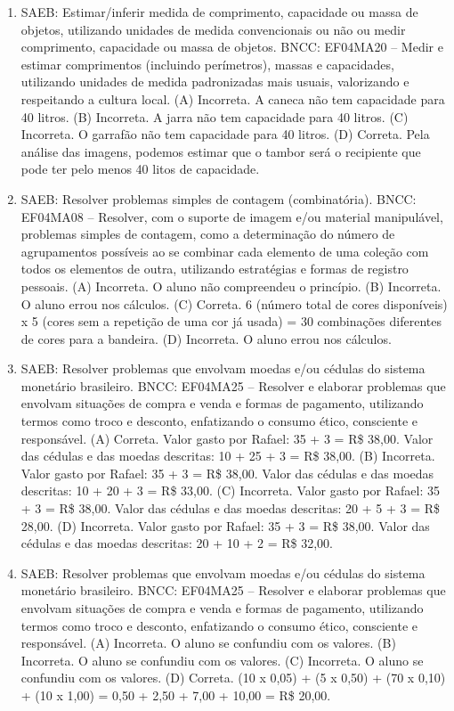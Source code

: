 \begin{enumerate}
\item
SAEB: Estimar/inferir medida de comprimento, capacidade ou
massa de objetos, utilizando unidades de medida convencionais ou não ou
medir comprimento, capacidade ou massa de objetos.
BNCC: EF04MA20 -- Medir e estimar comprimentos (incluindo perímetros), massas e capacidades, utilizando
unidades de medida padronizadas mais usuais, valorizando e respeitando a cultura local.
(A) Incorreta. A caneca não tem capacidade para 40 litros.
(B) Incorreta. A jarra não tem capacidade para 40 litros.
(C) Incorreta. O garrafão não tem capacidade para 40 litros.
(D) Correta. Pela análise das imagens, podemos estimar que o tambor será o recipiente que
pode ter pelo menos 40 litos de capacidade.

\item
SAEB: Resolver problemas simples de contagem (combinatória).
BNCC: EF04MA08 -- Resolver, com o suporte de imagem e/ou material manipulável, problemas simples
de contagem, como a determinação do número de agrupamentos possíveis ao se combinar cada
elemento de uma coleção com todos os elementos de outra, utilizando estratégias e formas de
registro pessoais.
(A) Incorreta. O aluno não compreendeu o princípio.
(B) Incorreta. O aluno errou nos cálculos.
(C) Correta. 6 (número total de cores disponíveis) x 5 (cores sem a repetição de uma cor já usada) = 30 combinações diferentes de cores para a bandeira.
(D) Incorreta. O aluno errou nos cálculos.

\item
SAEB: Resolver problemas que envolvam moedas e/ou cédulas do
sistema monetário brasileiro.
BNCC: EF04MA25 -- Resolver e elaborar problemas que envolvam situações de compra e venda e formas
de pagamento, utilizando termos como troco e desconto, enfatizando o consumo ético, consciente e
responsável.
(A) Correta. Valor gasto por Rafael: 35 + 3 = R\$ 38,00. Valor das cédulas e das moedas descritas: 10 + 25 + 3 = R\$ 38,00.
(B) Incorreta. Valor gasto por Rafael: 35 + 3 = R\$ 38,00. Valor das cédulas e das moedas descritas: 10 + 20 + 3 = R\$ 33,00.
(C) Incorreta. Valor gasto por Rafael: 35 + 3 = R\$ 38,00. Valor das cédulas e das moedas descritas: 20 + 5 + 3 = R\$ 28,00.
(D) Incorreta. Valor gasto por Rafael: 35 + 3 = R\$ 38,00. Valor das cédulas e das moedas descritas: 20 + 10 + 2 = R\$ 32,00.

\item
SAEB: Resolver problemas que envolvam moedas e/ou cédulas do
sistema monetário brasileiro.
BNCC: EF04MA25 -- Resolver e elaborar problemas que envolvam situações de compra e venda e formas
de pagamento, utilizando termos como troco e desconto, enfatizando o consumo ético, consciente e
responsável.
(A) Incorreta. O aluno se confundiu com os valores.
(B) Incorreta. O aluno se confundiu com os valores.
(C) Incorreta. O aluno se confundiu com os valores.
(D) Correta. (10 x 0,05) + (5 x 0,50) + (70 x 0,10) + (10 x 1,00) = 0,50 + 2,50 + 7,00 + 10,00 = R\$ 20,00.


\end{enumerate}
